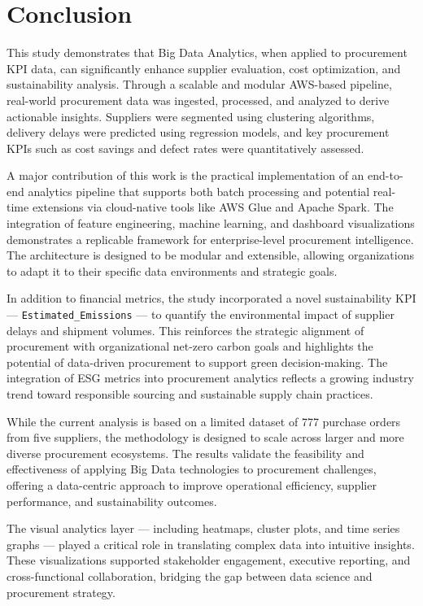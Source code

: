 \documentclass[10pt, twocolumn]{article}
\begin{document}
\section{Conclusion}

This study demonstrates that Big Data Analytics, when applied to procurement KPI data, can significantly enhance supplier evaluation, cost optimization, and sustainability analysis. Through a scalable and modular AWS-based pipeline, real-world procurement data was ingested, processed, and analyzed to derive actionable insights. Suppliers were segmented using clustering algorithms, delivery delays were predicted using regression models, and key procurement KPIs such as cost savings and defect rates were quantitatively assessed.

A major contribution of this work is the practical implementation of an end-to-end analytics pipeline that supports both batch processing and potential real-time extensions via cloud-native tools like AWS Glue and Apache Spark. The integration of feature engineering, machine learning, and dashboard visualizations demonstrates a replicable framework for enterprise-level procurement intelligence. The architecture is designed to be modular and extensible, allowing organizations to adapt it to their specific data environments and strategic goals.

In addition to financial metrics, the study incorporated a novel sustainability KPI — \texttt{Estimated\_Emissions} — to quantify the environmental impact of supplier delays and shipment volumes. This reinforces the strategic alignment of procurement with organizational net-zero carbon goals and highlights the potential of data-driven procurement to support green decision-making. The integration of ESG metrics into procurement analytics reflects a growing industry trend toward responsible sourcing and sustainable supply chain practices.

While the current analysis is based on a limited dataset of 777 purchase orders from five suppliers, the methodology is designed to scale across larger and more diverse procurement ecosystems. The results validate the feasibility and effectiveness of applying Big Data technologies to procurement challenges, offering a data-centric approach to improve operational efficiency, supplier performance, and sustainability outcomes.

The visual analytics layer — including heatmaps, cluster plots, and time series graphs — played a critical role in translating complex data into intuitive insights. These visualizations supported stakeholder engagement, executive reporting, and cross-functional collaboration, bridging the gap between data science and procurement strategy.
\end{document}
